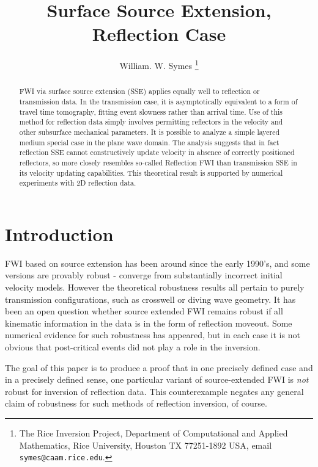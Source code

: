 \title{Surface Source Extension, Reflection Case}
\author{William. W. Symes \thanks{The Rice Inversion Project,
Department of Computational and Applied Mathematics, Rice University,
Houston TX 77251-1892 USA, email {\tt symes@caam.rice.edu}.}}



\maketitle
\begin{abstract}
FWI via surface source extension (SSE) applies equally well to reflection or transmission data. In the transmission case, it is asymptotically equivalent to a form of travel time tomography, fitting event slowness rather than arrival time. Use of this method for reflection data simply involves permitting reflectors in the velocity and other subsurface mechanical parameters. It is possible to analyze a simple layered medium special case in the plane wave domain. The analysis suggests that in fact reflection SSE cannot constructively update velocity in absence of correctly positioned reflectors, so more closely resembles so-called Reflection FWI than transmission SSE in its velocity updating capabilities. This theoretical result is supported by numerical experiments with 2D reflection data.
\end{abstract}

\section{Introduction}
FWI based on source extension has been around since the early 1990's,
and some versions are provably robust - converge from substantially
incorrect initial velocity models. However the theoretical robustness
results all pertain to purely transmission configurations, such as
crosswell or diving wave geometry. It has been an open question
whether source extended FWI remains robust if all kinematic
information in the data is in the form of reflection
moveout. Some numerical evidence for such robustness has appeared, but
in each case it is not obvious that post-critical events did not play
a role in the inversion.

The goal of this paper is to produce a proof that in one precisely
defined case and in a precisely defined sense, one particular variant
of source-extended FWI is {\em not} robust for inversion of reflection
data. This counterexample negates any general claim of robustness for
such methods of reflection inversion, of course.

